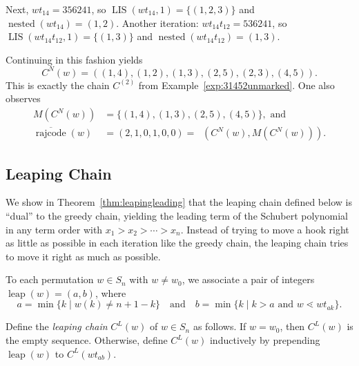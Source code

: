 \documentclass[ALCO]{cedram}
\DeclareMathOperator{\nested}{\mathrm{nested}}
\DeclareMathOperator{\leap}{\mathrm{leap}}
\DeclareMathOperator{\LIS}{\mathrm{LIS}}
\DeclareMathOperator{\dwt}{\overline{\mathrm{wt}}}
\DeclareMathOperator{\rr}{\mathrm{rajcode}}
\newcommand{\orr}{\overline{\rr}}
\newcommand{\CN}{C^N}
\newcommand{\CL}{C^L}
\begin{document}
\begin{example}
	Next, $wt_{14} = 356241$, so $\LIS(wt_{14},1) = \{(1,2,3)\}$ and $\nested(wt_{14})=(1,2)$. 
	Another iteration: $wt_{14}t_{12} = 536241$, so $\LIS(wt_{14}t_{12},1) = \{(1,3)\}$ and $\nested(wt_{14}t_{12})=(1,3)$. 
	
	Continuing in this fashion yields 
	\[\CN(w)=((1,4),(1,2),(1,3),(2,5),(2,3),(4,5)). \]
	This is exactly the chain $C^{(2)}$ from Example~\ref{exp:31452unmarked}. One also  observes 
	\begin{align*}
		M(\CN(w)) &= \{(1,4),(1,3),(2,5),(4,5)\}, \mbox{ and}\\
		\orr(w) &= (2,1,0,1,0,0) = \dwt(C^N(w),M(\CN(w))).
	\end{align*}
\end{example}

\subsection{Leaping Chain}

We show in Theorem~\ref{thm:leapingleading} that the leaping chain defined below is ``dual'' to the greedy chain, yielding the leading term of the Schubert polynomial in any term order with $x_1>x_2>\cdots>x_n$. Instead of trying to move a hook right as little as possible in each iteration like the greedy chain, the leaping chain tries to move it right as much as possible.

\begin{definition}
	To each permutation $w\in S_n$ with $w\neq w_0$, we associate a pair of integers $\leap(w)=(a,b)$, where
	\[a=\min\{k\mid w(k)\neq n+1-k\}\quad \mbox{and}\quad b=\min\{k\mid k>a\mbox{ and }w\lessdot wt_{ak}\}.\] 
\end{definition}

\begin{definition}
	\label{def:leaping}
	Define the \emph{leaping chain} $\CL(w)$ of $w\in S_n$ as follows. If $w=w_0$, then $\CL(w)$ is the empty sequence. Otherwise, define $\CL(w)$ inductively by prepending $\leap(w)$ to $\CL(wt_{ab})$.
\end{definition}
\end{document}
